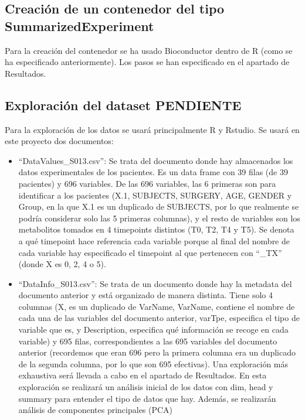 \documentclass[
]{article}
\begin{document}
\subsection{Creación de un contenedor del tipo
SummarizedExperiment}\label{creaciuxf3n-de-un-contenedor-del-tipo-summarizedexperiment}

Para la creación del contenedor se ha usado Bioconductor dentro de R
(como se ha especificado anteriormente). Los pasos se han especificado
en el apartado de Resultados.

\subsection{Exploración del dataset
PENDIENTE}\label{exploraciuxf3n-del-dataset-pendiente}

Para la exploración de los datos se usará principalmente R y Rstudio. Se
usará en este proyecto dos documentos:

\begin{itemize}
\item
  ``DataValues\_S013.csv'': Se trata del documento donde hay almacenados
  los datos experimentales de los pacientes. Es un data frame con 39
  filas (de 39 pacientes) y 696 variables. De las 696 variables, las 6
  primeras son para identificar a los pacientes (X.1, SUBJECTS, SURGERY,
  AGE, GENDER y Group, en la que X.1 es un duplicado de SUBJECTS, por lo
  que realmente se podría considerar solo las 5 primeras columnas), y el
  resto de variables son los metabolitos tomados en 4 timepoints
  distintos (T0, T2, T4 y T5). Se denota a qué timepoint hace referencia
  cada variable porque al final del nombre de cada variable hay
  especificado el timepoint al que pertenecen con ``\_TX'' (donde X es
  0, 2, 4 o 5).
\item
  ``DataInfo\_S013.csv'': Se trata de un documento donde hay la metadata
  del documento anterior y está organizado de manera distinta. Tiene
  solo 4 columnas (X, es un duplicado de VarName, VarName, contiene el
  nombre de cada una de las variables del documento anterior, varTpe,
  especifica el tipo de variable que es, y Description, especifica qué
  información se recoge en cada variable) y 695 filas, correspondientes
  a las 695 variables del documento anterior (recordemos que eran 696
  pero la primera columna era un duplicado de la segunda columna, por lo
  que son 695 efectivas). Una exploración más exhaustiva será llevada a
  cabo en el apartado de Resultados. En esta exploración se realizará un
  análisis inicial de los datos con dim, head y summary para entender el
  tipo de datos que hay. Además, se realizarán análisis de componentes
  principales (PCA)
\end{itemize}
\end{document}
